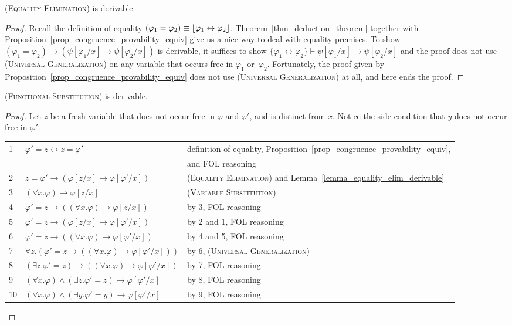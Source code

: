 \documentclass[acmsmall]{acmart}
\theoremstyle{acmdefinition}
\newcommand{\imp}{\to}
\newcommand{\dimp}{\leftrightarrow}
\newcommand{\prule}[1]{\textsc{(#1)}}
\newcommand{\universalgeneralization}{\prule{Universal Generalization}\xspace}
\newcommand{\variablesubstitution}{\prule{Variable Substitution}\xspace}
\newcommand{\equalityelimination}{\prule{Equality Elimination}\xspace}
\newcommand{\functionalsubstitution}{\prule{Functional Substitution}\xspace}
\DeclarePairedDelimiter{\floor}{\lfloor}{\rfloor}
\begin{document}
\begin{lemma}
\label{lemma_equality_elim_derivable}
\equalityelimination is derivable.
\end{lemma}
\begin{proof}
Recall the definition of equality
$(\varphi_1 = \varphi_2) \equiv \floor{\varphi_1 \dimp \varphi_2}$.
Theorem~\ref{thm_deduction_theorem} together with
Proposition~\ref{prop_congruence_provability_equiv} give us
a nice way to deal with equality premises.
To show
$(\varphi_1 = \varphi_2)
 \imp (\psi[\varphi_1 / x] \imp \psi[\varphi_2 / x])$
is derivable, 
it suffices to show
$\{ \varphi_1 \dimp \varphi_2 \} \vdash 
 \psi[\varphi_1 / x] \imp \psi[\varphi_2 / x]$
and the proof does not use \universalgeneralization on any variable
that occurs free in $\varphi_1$ or~$\varphi_2$.
Fortunately, the proof given by 
Proposition~\ref{prop_congruence_provability_equiv}
does not use \universalgeneralization at all, and here ends the proof.
\end{proof}

\begin{lemma}
\functionalsubstitution is derivable.
\end{lemma}
\begin{proof}
Let $z$ be a fresh variable that does not occur free
in $\varphi$ and $\varphi'$, and is distinct from $x$.
Notice the side condition that $y$ does not occur free in $\varphi'$.
\begin{center}
\begin{tabular}{l|ll}
1 & $\varphi' = z \dimp z = \varphi'$
  & definition of equality, Proposition~\ref{prop_congruence_provability_equiv},
    \\ && and FOL reasoning \\
2 & $z = \varphi'
     \imp (\varphi[z / x] \imp \varphi[\varphi'/x])$ 
  & \equalityelimination and Lemma~\ref{lemma_equality_elim_derivable} \\
3 & $( \forall x . \varphi) \imp \varphi[z/x]$
  & \variablesubstitution \\
4 & $\varphi' = z
     \imp (( \forall x . \varphi) \imp \varphi[z / x]  )$ 
  & by 3, FOL reasoning \\
5 & $\varphi' = z
     \imp (\varphi[z / x] \imp \varphi[\varphi'/x])$ 
  & by 2 and 1, FOL reasoning \\
6 & $\varphi' = z
     \imp (( \forall x . \varphi) \imp \varphi[\varphi'/x] )$ 
  & by 4 and 5, FOL reasoning \\
7 & $\forall z . (\varphi' = z
     \imp (( \forall x . \varphi) \imp \varphi[\varphi'/x] ))$ 
  & by 6, \universalgeneralization \\
8 & $(\exists z . \varphi' = z)
     \imp ( (\forall x . \varphi) \imp \varphi[\varphi'/x] )$ 
  & by 7, FOL reasoning \\
9 & $(\forall x . \varphi) \wedge (\exists z . \varphi' = z)
		\imp \varphi[\varphi'/x]$
  & by 8, FOL reasoning \\
10& $(\forall x . \varphi) \wedge (\exists y . \varphi' = y)
		\imp \varphi[\varphi'/x]$
  & by 9, FOL reasoning
\end{tabular}
\end{center}
\end{proof}
\end{document}
